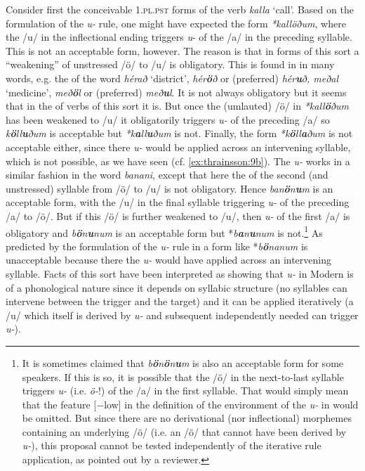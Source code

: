 \documentclass[output=paper,
modfonts
]{LSP/langsci}
\begin{document}
\noindent Consider first the conceivable \textsc{1.pl.pst} forms of the verb
\emph{kalla} `call'. Based on the formulation  of the
\emph{u-} rule, one might have expected the form \emph{*kallöðum},
where the /u/ in the inflectional ending triggers \emph{u}- of the
/a/ in the preceding syllable. This is not an acceptable form, however.
The reason is that in forms of this sort a ``weakening'' of unstressed
/ö/ to /u/ is obligatory. This  is found in in many words, e.g.
the  of the word \emph{hérað} `district', 
\emph{hér\textbf{ö}ð} or (preferred) \emph{hér\textbf{u}ð, meðal}
`medicine',  \emph{með\textbf{ö}l} or (preferred)
\emph{með\textbf{u}l}. It is not always obligatory but it seems that in
the  of verbs of this sort it is. But once the (umlauted) /ö/
in \emph{*kall\textbf{ö}ðum} has been weakened to /u/ it obligatorily
triggers \emph{u-} of the preceding /a/ so
\emph{k\textbf{ö}ll\textbf{u}ðum} is acceptable but
\emph{*k\textbf{a}ll\textbf{u}ðum} is not. Finally, the form
\emph{*k\textbf{ö}ll\textbf{a}ðum} is not acceptable either, since there
\emph{u-} would be applied across an intervening syllable, which
is not possible, as we have seen (cf. \ref{ex:thrainsson:9b}). The \emph{u-} works
in a similar fashion in the word \emph{banani}, except that here the
 of the second (and unstressed) syllable from /ö/ to /u/ is not
obligatory. Hence \emph{ban\textbf{ö}n\textbf{u}m} is an acceptable
form, with the /u/ in the final syllable triggering \emph{u-} of
the preceding /a/ to /ö/. But if this /ö/ is further weakened to /u/,
then \emph{u-} of the first /a/ is obligatory and
\emph{b\textbf{ö}n\textbf{u}num} is an acceptable form but
*\emph{b\textbf{a}n\textbf{u}num} is not.\footnote{It is sometimes
  claimed that \emph{b\textbf{ö}n\textbf{ö}n\textbf{u}m} is also an
  acceptable form for some speakers. If this is so, it is possible that
  the /ö/ in the next-to-last syllable triggers \emph{u-} (i.e.
  \emph{ö-}!) of the /a/ in the first syllable. That would simply
  mean that the feature {[}−low{]} in the definition of the environment
  of the \emph{u-} in  would be omitted. But since there are
  no derivational (nor inflectional) morphemes containing an underlying
  /ö/ (i.e. an /ö/ that cannot have been derived by \emph{u-}),
  this proposal cannot be tested independently of the iterative rule
  application, as pointed out by a reviewer.} As predicted by the
formulation of the \emph{u-} rule in  a form like
*\emph{b\textbf{ö}nanum} is unacceptable because there the
\emph{u-} would have applied across an intervening syllable. Facts
of this sort have been interpreted as showing that \emph{u-} in
Modern  is of a phonological nature since it depends on
syllabic structure (no syllables can intervene between the 
trigger and the target) and it can be applied iteratively (a /u/ which
itself is derived by \emph{u-} and subsequent independently needed
 can trigger \emph{u-}).
\end{document}
